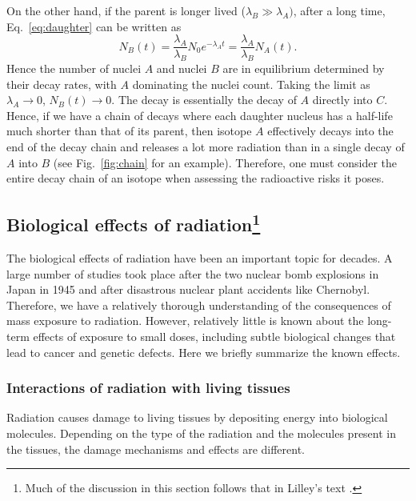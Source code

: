 \documentclass[nofootinbib,preprint,aps]{revtex4-1}
\begin{document}
        On the other hand, if the parent is longer lived
        ($\lambda_B \gg \lambda_A)$, after a long time, Eq.~\ref{eq:daughter} can be written as
        \begin{equation}
            N_B(t)=\frac{\lambda_A}{\lambda_B}N_0 e^{-\lambda_A t}=\frac{\lambda_A}{\lambda_B}N_A(t).
        \end{equation}
        Hence the number of nuclei $A$ and nuclei $B$ are in equilibrium determined by their decay rates, with
        $A$ dominating the nuclei count. Taking the limit as $\lambda_A \rightarrow 0$, $N_B(t)\rightarrow 0$.
        The decay is essentially the decay of $A$ directly into $C$. Hence, if we have a chain of decays 
        where each daughter nucleus has a half-life much shorter than that of its parent, then 
        isotope $A$ effectively decays into the end of the decay chain and releases a lot more radiation than
        in a single decay of $A$ into $B$ (see Fig.~\ref{fig:chain} for an example). Therefore, one must consider the entire decay chain of an isotope
        when assessing the radioactive risks it poses.

        \subsection{Biological effects of radiation\footnote{Much of the discussion in this section follows that in
        Lilley's text \cite[chapt. 7]{l01}.}}
        The biological effects of radiation have been an important topic for decades. A large
        number of studies took place after the two nuclear bomb explosions in Japan in 1945
        and after disastrous nuclear plant accidents like Chernobyl. Therefore, we have a relatively
        thorough understanding of the consequences of mass exposure to radiation. However, relatively
        little is known about the long-term effects of exposure to small doses, including subtle biological
        changes that lead to cancer and genetic defects. Here we briefly summarize the known effects.
        \subsubsection{Interactions of radiation with living tissues}
        \label{sec:interactions}
        Radiation causes damage to living tissues by depositing energy into biological molecules.
        Depending on the type of the radiation
        and the molecules present in the tissues, the damage mechanisms and effects are different.
\end{document}

